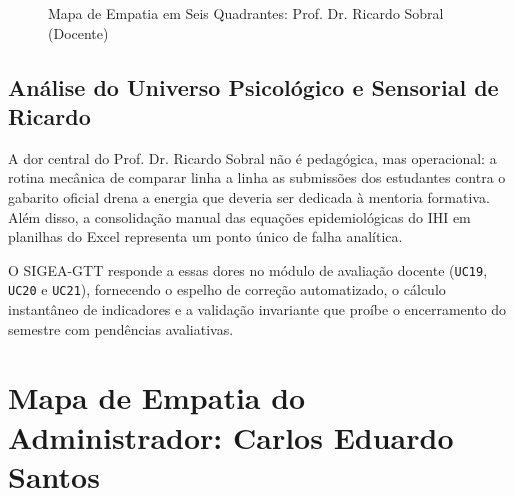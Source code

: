 \begin{figure}[!ht]
{
}
\caption{Mapa de Empatia em Seis Quadrantes: Prof. Dr. Ricardo Sobral (Docente)}
\label{fig_mapa_empatia_ricardo}
\end{figure}

\subsection{Análise do Universo Psicológico e Sensorial de Ricardo}
A dor central do Prof. Dr. Ricardo Sobral não é pedagógica, mas operacional: a rotina mecânica de comparar linha a linha as submissões dos estudantes contra o gabarito oficial drena a energia que deveria ser dedicada à mentoria formativa. Além disso, a consolidação manual das equações epidemiológicas do IHI em planilhas do Excel representa um ponto único de falha analítica.

O SIGEA-GTT responde a essas dores no módulo de avaliação docente (\texttt{UC19}, \texttt{UC20} e \texttt{UC21}), fornecendo o espelho de correção automatizado, o cálculo instantâneo de indicadores e a validação invariante que proíbe o encerramento do semestre com pendências avaliativas.

\section{Mapa de Empatia do Administrador: Carlos Eduardo Santos}
\label{sec_mapa_carlos}

